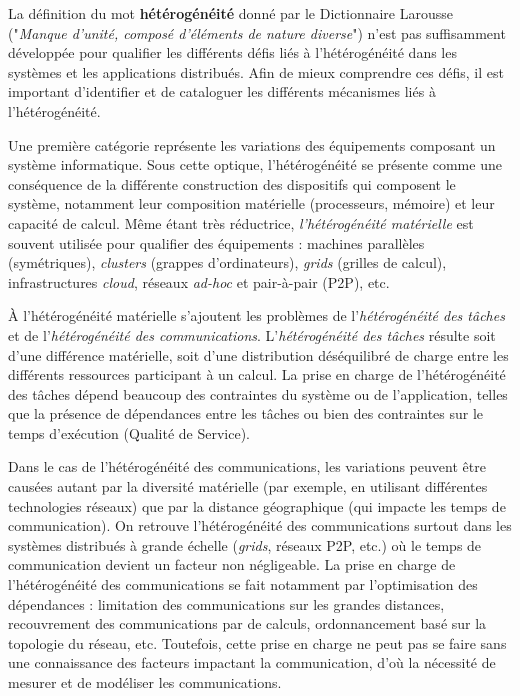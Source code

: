 
La définition du mot \textbf{hétérogénéité} donné par le Dictionnaire Larousse ("\textit{Manque d'unité, composé d'éléments de nature diverse}") n'est pas suffisamment développée pour qualifier les différents défis liés à l'hétérogénéité dans les systèmes et les applications distribués. Afin de mieux comprendre ces défis, il est important d'identifier et de cataloguer les différents mécanismes liés à l'hétérogénéité.

Une première catégorie représente les variations des équipements composant un système informatique. Sous cette optique, l'hétérogénéité se présente comme une conséquence de la différente construction des dispositifs qui composent le système, notamment leur composition matérielle (processeurs, mémoire) et leur capacité de calcul.   Même étant très réductrice, \textit{l'hétérogénéité matérielle} est souvent utilisée pour qualifier des équipements : machines parallèles (symétriques), \textit{clusters} (grappes d'ordinateurs), \textit{grids} (grilles de calcul), infrastructures \textit{cloud}, réseaux \textit{ad-hoc} et pair-à-pair (P2P), etc.

À l'hétérogénéité matérielle s'ajoutent les problèmes de l'\textit{hétérogénéité des tâches} et de l'\textit{hétérogénéité des communications}. L'\textit{hétérogénéité des tâches} résulte soit d'une différence matérielle, soit d'une distribution déséquilibré de charge entre les différents ressources participant à un calcul. La prise en charge de l'hétérogénéité des tâches dépend beaucoup des contraintes du système ou de l'application, telles que la présence de dépendances entre les tâches ou bien des contraintes sur le temps d'exécution (Qualité de Service).

Dans le cas de l'hétérogénéité des communications, les variations peuvent être causées autant par la diversité matérielle (par exemple, en utilisant différentes technologies réseaux) que par la distance géographique (qui impacte les temps de communication). On retrouve l'hétérogénéité des communications surtout dans les systèmes distribués à grande échelle (\textit{grids}, réseaux P2P, etc.) où le temps de communication devient un facteur non négligeable. La prise en charge de l'hétérogénéité des communications se fait notamment par l'optimisation des dépendances : limitation des communications sur les grandes distances,  recouvrement des communications par de calculs, ordonnancement basé sur la topologie du réseau, etc. Toutefois, cette prise en charge ne peut pas se faire sans une connaissance des facteurs impactant la communication, d'où la nécessité de mesurer et de modéliser les communications. 

